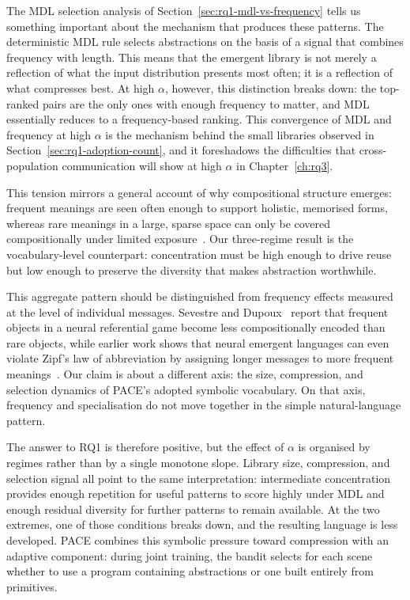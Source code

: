 The MDL selection analysis of Section~\ref{sec:rq1-mdl-vs-frequency} tells us something important about the mechanism that produces these patterns. The deterministic MDL rule selects abstractions on the basis of a signal that combines frequency with length. This means that the emergent library is not merely a reflection of what the input distribution presents most often; it is a reflection of what compresses best. At high $\alpha$, however, this distinction breaks down: the top-ranked pairs are the only ones with enough frequency to matter, and MDL essentially reduces to a frequency-based ranking. This convergence of MDL and frequency at high $\alpha$ is the mechanism behind the small libraries observed in Section~\ref{sec:rq1-adoption-count}, and it foreshadows the difficulties that cross-population communication will show at high $\alpha$ in Chapter~\ref{ch:rq3}.

This tension mirrors a general account of why compositional structure emerges: frequent meanings are seen often enough to support holistic, memorised forms, whereas rare meanings in a large, sparse space can only be covered compositionally under limited exposure~\cite{gibson_how_2019,kirby_compression_2015}. Our three-regime result is the vocabulary-level counterpart: concentration must be high enough to drive reuse but low enough to preserve the diversity that makes abstraction worthwhile.

This aggregate pattern should be distinguished from frequency effects measured at the level of individual messages. Sevestre and Dupoux~\cite{sevestre_frequency_2025} report that frequent objects in a neural referential game become less compositionally encoded than rare objects, while earlier work shows that neural emergent languages can even violate Zipf's law of abbreviation by assigning longer messages to more frequent meanings~\cite{chaabouni_anti-efficient_2019}. Our claim is about a different axis: the size, compression, and selection dynamics of PACE's adopted symbolic vocabulary. On that axis, frequency and specialisation do not move together in the simple natural-language pattern.

The answer to RQ1 is therefore positive, but the effect of $\alpha$ is organised by regimes rather than by a single monotone slope. Library size, compression, and selection signal all point to the same interpretation: intermediate concentration provides enough repetition for useful patterns to score highly under MDL and enough residual diversity for further patterns to remain available. At the two extremes, one of those conditions breaks down, and the resulting language is less developed. PACE combines this symbolic pressure toward compression with an adaptive component: during joint training, the bandit selects for each scene whether to use a program containing abstractions or one built entirely from primitives.
